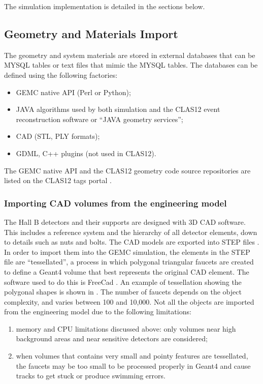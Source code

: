 The simulation implementation is detailed in the sections below.

\subsection{Geometry and Materials Import}

The geometry and system materials are stored in external databases that can be MYSQL tables or text files that
mimic the MYSQL tables. The databases can be defined using the following factories:

\begin{itemize}
	\item GEMC native API (Perl or Python);
	\item JAVA algorithms used by both simulation and the CLAS12 event reconstruction software \cite{recon-nim} or ``JAVA geometry services'';
	\item CAD (STL, PLY formats);
	\item GDML, C++ plugins (not used in CLAS12).
\end{itemize}



The GEMC native API and the CLAS12 geometry code source repositories are listed on the CLAS12
tags portal \cite{clas12Tags}.


\subsubsection{Importing CAD volumes from the engineering model}

The Hall B detectors and their supports are designed with 3D CAD software. This includes a reference system and the
hierarchy of all detector elements, down to details such as nuts and bolts.
The CAD models are exported into STEP files \cite{stepFiles}.
In order to import them into the GEMC simulation, the elements in the STEP file are ``tessellated'',
a process in which polygonal triangular faucets are created to define a Geant4 volume that best represents
the original CAD element.
The software used to do this is FreeCad \cite{freeCad}. An example of tessellation showing the polygonal shapes
is shown in . The number of faucets depends on the object complexity, and varies between
100 and 10,000.
Not all the objects are imported from the engineering model due to the following limitations:

\begin{enumerate}
\item memory and CPU limitations discussed above:  only volumes near high background areas and near sensitive detectors are considered;
\item when volumes that contains very small and pointy features are tessellated, the faucets may be too small
      to be processed properly in Geant4 and cause tracks to get stuck or produce swimming errors.
\end{enumerate}


